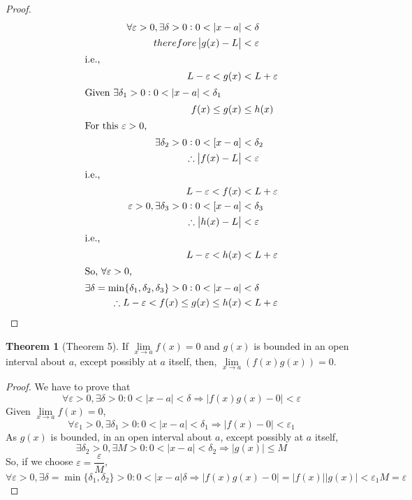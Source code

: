 \documentclass[fleqn]{article}
\theoremstyle{definition}
\theoremstyle{theorem}
\newtheorem{theorem}{Theorem}
\theoremstyle{remark}
\begin{document}
\begin{proof}
	\begin{align*}
	\forall \varepsilon > 0, \exists \delta > 0 : 0 < \left|x - a\right| &< \delta \\
	therefore \left|g(x) - L\right| &< \varepsilon \\
	\intertext{i.e.,}
	L - \varepsilon < g(x) &< L + \varepsilon\\
	\intertext{Given $\exists \delta_1 > 0 : 0 < \left|x - a\right| < \delta_1$}
	 f(x) \leq g(x) &\leq h(x)\\
	\intertext{For this $\varepsilon > 0$,} 
	\exists \delta_2 > 0 : 0 < \left[x - a\right] &< \delta_2\\
	\therefore \left|f(x) - L\right| &< \varepsilon \\
	\intertext{i.e.,} 
	L - \varepsilon < f(x) &< L + \varepsilon\\
	\varepsilon > 0, \exists \delta_3 > 0 : 0 < \left[x - a\right] &< \delta_3 \\ \therefore \left|h(x) - L\right| &< \varepsilon \\
	\intertext{i.e.,} 
	L - \varepsilon < h(x) &< L + \varepsilon\\
	\intertext{So, $\forall \varepsilon > 0$,} 
	\exists \delta = \min\{\delta_1, \delta_2, \delta_3\} > 0 : 0 < \left|x - a\right| &< \delta \\
	\therefore L-\varepsilon < f(x) \leq g(x) \leq h(x) &< L + \varepsilon
	\end{align*}
\end{proof}

\begin{theorem}[Theorem 5]
	If $\lim\limits_{x \rightarrow a} f(x) = 0$ and $g(x)$ is bounded in an open interval about $a$, except possibly at $a$ itself, then, $\lim\limits_{x \rightarrow a}(f(x)g(x)) = 0$.
\end{theorem}

\begin{proof}
	We have to prove that
	\begin{equation*}
		\forall \varepsilon > 0, \exists \delta > 0 : 0 < \left|x - a\right| < \delta \Rightarrow \left|f(x) g(x) - 0\right| < \varepsilon
	\end{equation*}
	Given $\lim\limits_{x \rightarrow a} f(x) = 0$,
	\begin{equation*}
		\forall \varepsilon_1 > 0, \exists \delta_1 > 0 : 0 < \left|x - a\right| < \delta_1 \Rightarrow \left|f(x) - 0\right| < \varepsilon_1
	\end{equation*}
	As $g(x)$ is bounded, in an open interval about $a$, except possibly at $a$ itself,
	\begin{equation*}
		\exists \delta_2 > 0, \exists M > 0 : 0 < \left|x - a\right| < \delta_2 \Rightarrow \left|g(x)\right| \leq M
	\end{equation*}
	So, if we choose $\varepsilon = \dfrac{\varepsilon}{M}$, 
	\begin{equation*}
		\forall \varepsilon > 0, \exists \delta = \min\{\delta_1, \delta_2\} > 0 : 0 < \left|x - a\right| \delta \Rightarrow \left|f(x) g(x) - 0\right| = |f(x)| |g(x)| < \varepsilon_1 M = \varepsilon
	\end{equation*}
\end{proof}
\end{document}
